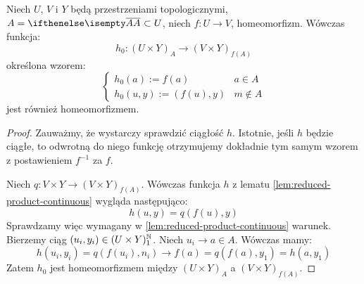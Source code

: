 \begin{lem}
  Niech $U$, $V$ i $Y$ będą przestrzeniami topologicznymi, $A = \cl A \subset U$, niech  $f: U \to V$, homeomorfizm. Wówczas funkcja:
  \[
    h_0: (U \times Y)_A \to (V \times Y)_{f(A)}
  \]
  określona wzorem:
  \[
    \begin{cases}
      h_0(a) := f(a)& a\in A \\
      h_0(u,y) := (f(u), y)& m\not\in A
    \end{cases}
  \]
  jest również homeomorfizmem.
  \begin{proof}
    Zauważmy, że wystarczy sprawdzić ciągłość $h$. Istotnie, jeśli $h$ będzie ciągłe, to odwrotną do niego funkcję otrzymujemy dokładnie tym samym wzorem z postawieniem $f^{-1}$ za $f$.

    Niech $q: V\times Y \to (V\times Y)_{f(A)}$. Wówczas funkcja $h$ z lematu \ref{lem:reduced-product-continuous} wygląda następująco:
    \[
      h(u,y) = q(f(u),y)
    \]
    Sprawdzamy więc wymagany w \ref{lem:reduced-product-continuous} warunek. Bierzemy ciąg $(u_i, y_i) \in (U\times Y)^\mathbb{N}_1$. Niech $u_i \to a \in A$. Wówczas mamy:
    \[
      h(u_i,y_i) = q(f(u_i), n_i) \to f(a) = q(f(a),y_1) = h(a,y_1)
    \]
    Zatem $h_0$ jest homeomorfizmem między $(U \times Y)_A$ a $(V \times Y)_{f(A)}$.
  \end{proof}
\end{lem}

